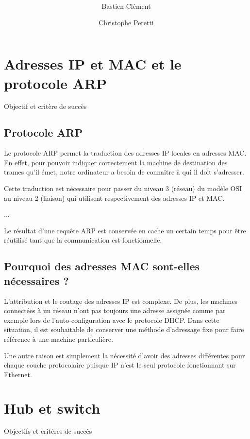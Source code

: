 \documentclass[11pt,a4paper]{article}
\author{Bastien Clément \and Christophe Peretti}
\title{{\normalsize \doccourse} \\ \doctitle }
\begin{document}
\maketitle
\vspace{1em}

\section{Adresses IP et MAC et le protocole ARP}

Objectif et critère de succès

\subsection{Protocole ARP}

Le protocole ARP permet la traduction des adresses IP locales en adresses MAC. En effet, pour pouvoir indiquer correctement la machine de destination des trames qu'il émet, notre ordinateur a besoin de connaitre à qui il doit s'adresser.

Cette traduction est nécessaire pour passer du niveau 3 (réseau) du modèle OSI au niveau 2 (liaison) qui utilisent respectivement des adresses IP et MAC.

...

Le résultat d'une requête ARP est conservée en cache un certain temps pour être réutilisé tant que la communication est fonctionnelle.

\subsection{Pourquoi des adresses MAC sont-elles nécessaires ?}

L'attribution et le routage des adresses IP est complexe. De plus, les machines connectées à un réseau n'ont pas toujours une adresse assignée comme par exemple lors de l'auto-configuration avec le protocole DHCP. Dans cette situation, il est souhaitable de conserver une méthode d'adressage fixe pour faire référence à une machine particulière.

Une autre raison est simplement la nécessité d'avoir des adresses différentes pour chaque couche protocolaire puisque IP n'est le seul protocole fonctionnant sur Ethernet.

\section{Hub et switch}

Objectifs et critères de succès
\end{document}
